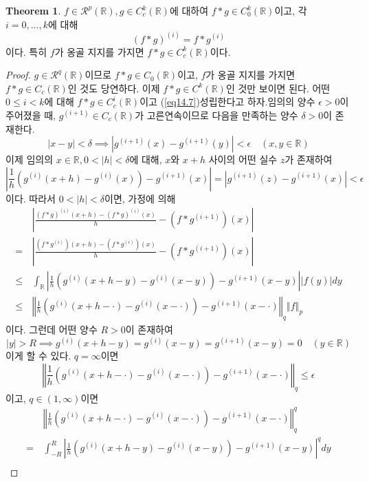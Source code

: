 \documentclass[11pt]{book}
\numberwithin{equation}{chapter}
\def\RR{\mathbb{R}}
\def\eps{\epsilon}
\def\calR{\mathcal{R}}
\newcommand{\abs}[1]{\left\vert#1\right\vert}
\newcommand{\norm}[1]{\left\Vert#1\right\Vert}
\theoremstyle{definition}
\newtheorem{thm}{Theorem}[section]
\begin{document}
\begin{thm}
    \(f \in \calR^p(\RR), g \in C_c^k(\RR)\)에 대하여 \(f * g \in C_0^k(\RR)\)이고, 각 \(i = 0, \ldots, k\)에 대해
    \begin{equation} \label{eq14.7}
        (f*g)^{(i)} = f * g^{(i)}
    \end{equation}
    이다. 특히 \(f\)가 옹골 지지를 가지면 \(f * g \in C_c^k(\RR)\)이다.
\end{thm}
\begin{proof}
    \(g \in \calR^q(\RR)\)이므로 \(f * g \in C_0(\RR)\)이고, \(f\)가 옹골 지지를 가지면 \(f * g \in C_c(\RR)\)인 것도 당연하다. 이제 \(f * g \in C^k(\RR)\)인 것만 보이면 된다. 어떤 \(0 \le i < k\)에 대해 \(f*g \in C_c^i(\RR)\)이고 (\ref{eq14.7})\이 성립한다고 하자.임의의 양수 \(\eps > 0\)이 주어졌을 때, \(g^{(i+1)} \in C_c(\RR)\)가 고른연속이므로 다음을 만족하는 양수 \(\delta > 0\)이 존재한다.
    \[
    \abs{x-y} < \delta \implies \abs{g^{(i+1)}(x) - g^{(i+1)}(y)} < \eps \quad (x, y \in \RR)
    \]
    이제 임의의 \(x \in \RR, 0 < \abs{h} < \delta\)에 대해, \(x\)와 \(x+h\) 사이의 어떤 실수 \(z\)가 존재하여
    \[
    \abs{\frac{1}{h}(g^{(i)}(x+h) - g^{(i)}(x)) - g^{(i+1)}(x)} = \abs{g^{(i+1)}(z) - g^{(i+1)}(x)} < \eps
    \]
    이다. 따라서 \(0 < \abs{h} < \delta\)이면, 가정에 의해
    \begin{align*}
        &\abs{\frac{(f*g)^{(i)}(x+h) - (f*g)^{(i)}(x)}{h} - (f * g^{(i+1)})(x)}\\
        =\,& \abs{\frac{(f * g^{(i)})(x+h) - (f * g^{(i)})(x)}{h} - (f * g^{(i+1)})(x)}\\
        \le\,& \int_{\RR} \abs{\frac{1}{h}(g^{(i)}(x+h-y) - g^{(i)}(x-y)) - g^{(i+1)}(x-y)} \abs{f(y)} dy\\
        \le\,& \norm{\frac{1}{h}(g^{(i)}(x+h-\cdot) - g^{(i)}(x-\cdot)) - g^{(i+1)}(x-\cdot)}_{q} \norm{f}_p
    \end{align*}
    이다. 그런데 어떤 양수 \(R > 0\)이 존재하여
    \[
    \abs{y} > R \implies g^{(i)}(x+h-y) = g^{(i)}(x-y) = g^{(i+1)}(x-y) = 0 \quad (y \in \RR)
    \]
    이게 할 수 있다. \(q = \infty\)이면
    \[
        \norm{\frac{1}{h}(g^{(i)}(x+h-\cdot) - g^{(i)}(x-\cdot)) - g^{(i+1)}(x-\cdot)}_{q} \le \eps
    \]
    이고, \(q \in (1, \infty)\)이면
    \begin{align*}
        &\norm{\frac{1}{h}(g^{(i)}(x+h-\cdot) - g^{(i)}(x-\cdot)) - g^{(i+1)}(x-\cdot)}_{q}^q\\
        =\,& \int_{-R}^R \abs{\frac{1}{h}(g^{(i)}(x+h-y) - g^{(i)}(x-y)) - g^{(i+1)}(x-y)}^q dy\\

\end{align*}
\end{proof}
\end{document}
